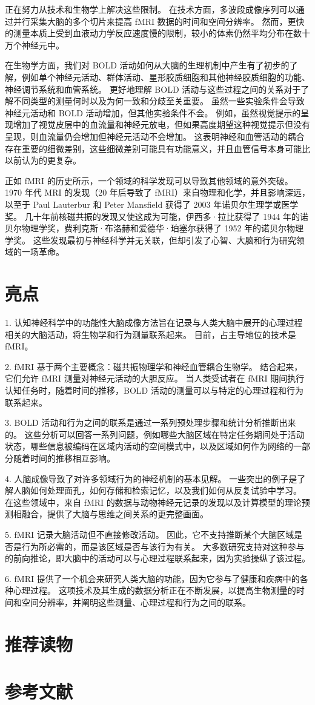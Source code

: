 正在努力从技术和生物学上解决这些限制。 
在技术方面，多波段成像序列可以通过并行采集大脑的多个切片来提高 fMRI 数据的时间和空间分辨率。 
然而，更快的测量本质上受到血液动力学反应速度慢的限制，较小的体素仍然平均分布在数十万个神经元中。


在生物学方面，我们对 BOLD 活动如何从大脑的生理机制中产生有了初步的了解，例如单个神经元活动、群体活动、星形胶质细胞和其他神经胶质细胞的功能、神经调节系统和血管系统。 
更好地理解 BOLD 活动与这些过程之间的关系对于了解不同类型的测量何时以及为何一致和分歧至关重要。 
虽然一些实验条件会导致神经元活动和 BOLD 活动增加，但其他实验条件不会。 
例如，虽然视觉提示的呈现增加了视觉皮层中的血流量和神经元放电，但如果高度期望这种视觉提示但没有呈现，则血流量仍会增加但神经元活动不会增加。 
这表明神经和血管活动的耦合存在重要的细微差别，这些细微差别可能具有功能意义，并且血管信号本身可能比以前认为的更复杂。


正如 fMRI 的历史所示，一个领域的科学发现可以导致其他领域的意外突破。 
1970 年代 MRI 的发现（20 年后导致了 fMRI）来自物理和化学，并且影响深远，以至于 Paul Lauterbur 和 Peter Mansfield 获得了 2003 年诺贝尔生理学或医学奖。
几十年前核磁共振的发现又使这成为可能，伊西多·拉比获得了 1944 年的诺贝尔物理学奖，费利克斯·布洛赫和爱德华·珀塞尔获得了 1952 年的诺贝尔物理学奖。 
这些发现最初与神经科学并无关联，但却引发了心智、大脑和行为研究领域的一场革命。


\section{亮点}

1. 认知神经科学中的功能性大脑成像方法旨在记录与人类大脑中展开的心理过程相关的大脑活动，将生物学和行为测量联系起来。 
目前，占主导地位的技术是 fMRI。 

2. fMRI 基于两个主要概念：磁共振物理学和神经血管耦合生物学。 
结合起来，它们允许 fMRI 测量对神经元活动的大胆反应。 
当人类受试者在 fMRI 期间执行认知任务时，随着时间的推移，BOLD 活动的测量可以与特定的心理过程和行为联系起来。 

3. BOLD 活动和行为之间的联系是通过一系列预处理步骤和统计分析推断出来的。 
这些分析可以回答一系列问题，例如哪些大脑区域在特定任务期间处于活动状态，哪些信息被编码在区域内活动的空间模式中，以及区域如何作为网络的一部分随着时间的推移相互影响。 

4. 人脑成像导致了对许多领域行为的神经机制的基本见解。 
一些突出的例子是了解人脑如何处理面孔，如何存储和检索记忆，以及我们如何从反复试验中学习。 
在这些领域中，来自 fMRI 的数据与动物神经元记录的发现以及计算模型的理论预测相融合，提供了大脑与思维之间关系的更完整画面。 


5. fMRI 记录大脑活动但不直接修改活动。 
因此，它不支持推断某个大脑区域是否是行为所必需的，而是该区域是否与该行为有关。 
大多数研究支持对这种参与的前向推论，即大脑中的活动可以与心理过程联系起来，因为实验操纵了该过程。 


6. fMRI 提供了一个机会来研究人类大脑的功能，因为它参与了健康和疾病中的各种心理过程。 
这项技术及其生成的数据分析正在不断发展，以提高生物测量的时间和空间分辨率，并阐明这些测量、心理过程和行为之间的联系。


\section{推荐读物}

\section{参考文献}
